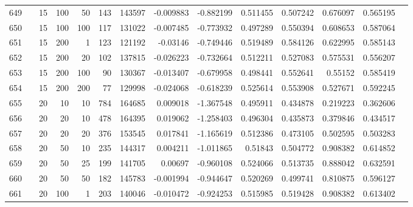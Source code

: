\begin{longtable}{llrrrrrrrrrrrr}
		649 & &           15 &               100 &           50 &         143 &     143597 & -0.009883 & -0.882199 &  0.511455 &    0.507242 &       0.676097 &  0.565195 \\
		650 & &           15 &               100 &          100 &         117 &     131022 & -0.007485 & -0.773932 &  0.497289 &    0.550394 &       0.608653 &  0.587064 \\
		651 & &           15 &               200 &            1 &         123 &     121192 &  -0.03146 & -0.749446 &  0.519489 &    0.584126 &       0.622995 &  0.585143 \\
		652 & &           15 &               200 &           20 &         102 &     137815 & -0.026223 & -0.732664 &  0.512211 &    0.527083 &       0.575531 &  0.556207 \\
		653 & &           15 &               200 &          100 &          90 &     130367 & -0.013407 & -0.679958 &  0.498441 &    0.552641 &        0.55152 &  0.585419 \\
		654 & &           15 &               200 &          200 &          77 &     129998 & -0.024068 & -0.618239 &  0.525614 &    0.553908 &       0.527671 &  0.592245 \\
		655 & &           20 &                10 &           10 &         784 &     164685 &  0.009018 & -1.367548 &  0.495911 &    0.434878 &       0.219223 &  0.362606 \\
		656 & &           20 &                20 &           10 &         478 &     164395 &  0.019062 & -1.258403 &  0.496304 &    0.435873 &       0.379846 &  0.434517 \\
		657 & &           20 &                20 &           20 &         376 &     153545 &  0.017841 & -1.165619 &  0.512386 &    0.473105 &       0.502595 &  0.503283 \\
		658 & &           20 &                50 &           10 &         235 &     144317 &  0.004211 & -1.011865 &   0.51843 &    0.504772 &       0.908382 &  0.614852 \\
		659 & &           20 &                50 &           25 &         199 &     141705 &   0.00697 & -0.960108 &  0.524066 &    0.513735 &       0.888042 &  0.632591 \\
		660 & &           20 &                50 &           50 &         182 &     145783 & -0.001994 & -0.944647 &  0.520269 &    0.499741 &       0.810875 &  0.596127 \\
		661 & &           20 &               100 &            1 &         203 &     140046 & -0.010472 & -0.924253 &  0.515985 &    0.519428 &       0.908382 &  0.613402 \\

\end{longtable}
